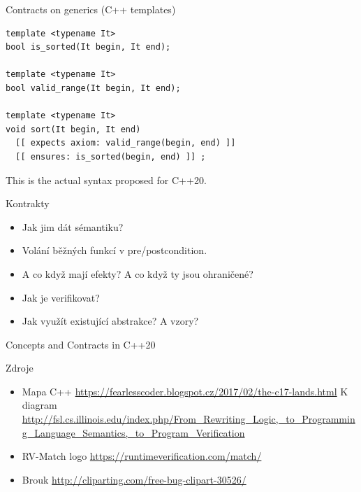 \documentclass[11pt]{beamer}
\begin{document}
%
\begin{frame}[fragile=singleslide]{Contracts on generics (C++ templates)}
\begin{lstlisting}
template <typename It>
bool is_sorted(It begin, It end);

template <typename It>
bool valid_range(It begin, It end);

template <typename It>
void sort(It begin, It end)
  [[ expects axiom: valid_range(begin, end) ]]
  [[ ensures: is_sorted(begin, end) ]] ;
\end{lstlisting}
\pause This is the actual syntax proposed for C++20.
\end{frame}


\begin{frame}{Kontrakty}
\begin{itemize}
\pause \item Jak jim dát sémantiku?
\pause \item Volání běžných funkcí v pre/postcondition.
\pause \item A co když mají efekty? A co když ty jsou ohraničené?
\pause \item Jak je verifikovat?
\pause \item Jak využít existující abstrakce? A vzory?
\end{itemize}
\end{frame}


\begin{frame}{Concepts and Contracts in C++20}

\end{frame}

\begin{frame}{Zdroje}
\begin{itemize}
\item Mapa C++ \url{https://fearlesscoder.blogspot.cz/2017/02/the-c17-lands.html}
K diagram \url{http://fsl.cs.illinois.edu/index.php/From\_Rewriting\_Logic,\_to\_Programming\_Language\_Semantics,\_to\_Program\_Verification} \\
\item RV-Match logo \url{https://runtimeverification.com/match/}
\item Brouk \url{http://cliparting.com/free-bug-clipart-30526/}
\end{itemize}
\end{frame}
\end{document}
